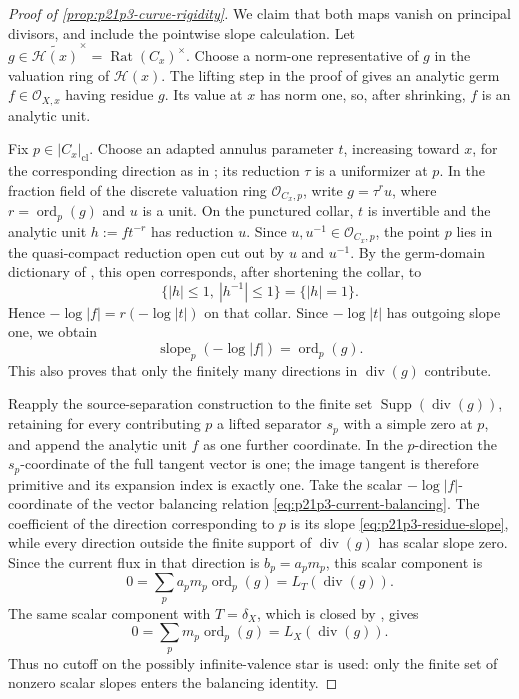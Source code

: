\begin{proof}[Proof of \cref{prop:p21p3-curve-rigidity}]
We claim that both maps vanish on principal divisors, and include the
pointwise slope calculation.  Let
\(g\in\widetilde{\mathcal H(x)}^\times
      =\operatorname{Rat}(C_x)^\times\).
Choose a norm-one representative of \(g\) in the valuation ring of
\(\mathcal H(x)\).  The
lifting step in the proof of \cite[Lemma~6.14]{GJR26} gives an analytic
germ \(f\in\mathcal O_{X,x}\) having residue \(g\).  Its value at \(x\)
has norm one, so, after shrinking, \(f\) is an analytic unit.

Fix \(p\in |C_x|_{\mathrm{cl}}\).  Choose an adapted annulus parameter \(t\),
increasing toward \(x\), for the corresponding direction as in
\cite[\S18.2.8]{CLD25}; its reduction
\(\tau\) is a uniformizer at \(p\).  In the fraction field of the
discrete valuation ring \(\mathcal O_{C_x,p}\), write
\(
 g=\tau^{r}u
\), where \(r=\operatorname{ord}_p(g)\) and \(u\) is a unit.  On the
punctured collar, \(t\) is invertible and the analytic unit
\(h:=ft^{-r}\) has reduction \(u\).  Since
\(u,u^{-1}\in\mathcal O_{C_x,p}\), the point \(p\) lies in the
quasi-compact reduction open cut out by \(u\) and \(u^{-1}\).  By the
germ-domain dictionary of \cite[\S11.8.6]{CLD25}, this open corresponds,
after shortening the collar, to
\[
                   \{|h|\leq1,\ |h^{-1}|\leq1\}
                   =\{|h|=1\}.
\]
Hence \(-\log|f|=r(-\log|t|)\) on that collar.  Since
\(-\log|t|\) has outgoing slope one, we obtain
\begin{equation}
\label{eq:p21p3-residue-slope}
 \operatorname{slope}_{p}(-\log|f|)
      =\operatorname{ord}_p(g).
\end{equation}
This also proves that only the finitely many directions in
\(\operatorname{div}(g)\) contribute.

Reapply the source-separation construction to the finite set
\(\operatorname{Supp}(\operatorname{div}(g))\), retaining for every
contributing \(p\) a lifted separator \(s_p\) with a simple zero at \(p\),
and append the analytic unit \(f\) as one further coordinate.  In the
\(p\)-direction the \(s_p\)-coordinate of the full tangent vector is one;
the image tangent is therefore primitive and its expansion index is
exactly one.  Take the scalar
\(-\log|f|\)-coordinate of the vector balancing relation
\eqref{eq:p21p3-current-balancing}.  The coefficient of the direction
corresponding to \(p\) is its slope
\eqref{eq:p21p3-residue-slope}, while every direction outside the finite
support of \(\operatorname{div}(g)\) has scalar slope zero.  Since the
current flux in that direction is \(b_p=a_pm_p\), this scalar component is
\begin{equation}
\label{eq:p21p3-T-principal}
       0=\sum_p a_pm_p\operatorname{ord}_p(g)
        =L_T(\operatorname{div}(g)).
\end{equation}
The same scalar component with \(T=\delta_X\), which is closed by
\cite[\S7.7.4]{CLD25}, gives
\begin{equation}
\label{eq:p21p3-X-principal}
       0=\sum_p m_p\operatorname{ord}_p(g)
        =L_X(\operatorname{div}(g)).
\end{equation}
Thus no cutoff on the possibly infinite-valence star is used: only the
finite set of nonzero scalar slopes enters the balancing identity.


\end{proof}
